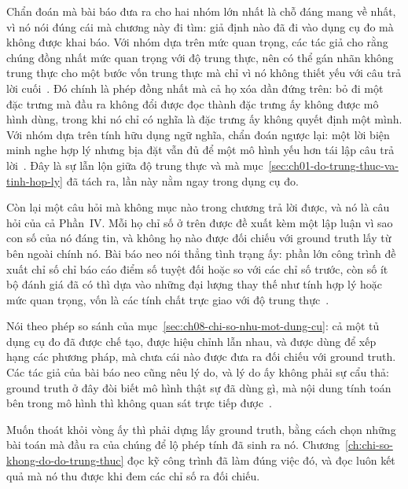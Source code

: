 Chẩn đoán mà bài báo đưa ra cho hai nhóm lớn nhất là chỗ đáng mang về nhất, vì
nó nói đúng cái mà chương này đi tìm: giả định nào đã đi vào dụng cụ đo mà
không được khai báo. Với nhóm dựa trên
mức quan trọng, các tác giả cho rằng chúng đồng nhất mức quan trọng với độ trung
thực, nên có thể gán nhãn không trung thực cho một bước vốn trung thực mà chỉ vì
nó không thiết yếu với câu trả lời cuối~\autocite{p21metrics}. Đó chính là phép
đồng nhất mà cả họ xóa dần đứng trên: bỏ đi một đặc trưng mà đầu ra không đổi
được đọc thành đặc trưng ấy không được mô hình dùng, trong khi nó chỉ có nghĩa
là đặc trưng ấy không quyết định một mình. Với nhóm dựa trên tính hữu dụng ngữ
nghĩa, chẩn đoán ngược lại: một lời biện minh nghe hợp lý nhưng bịa đặt vẫn đủ
để một mô hình yếu hơn tái lập câu trả lời~\autocite{p21metrics}. Đây là sự lẫn
lộn giữa độ trung thực và  mà
mục~\ref{sec:ch01-do-trung-thuc-va-tinh-hop-ly} đã tách ra, lần này nằm ngay
trong dụng cụ đo.

Còn lại một câu hỏi mà không mục nào trong chương trả lời được, và nó là câu hỏi
của cả Phần~IV. Mỗi họ chỉ số ở trên được đề xuất kèm một lập luận vì sao con số
của nó đáng tin, và không họ nào được đối chiếu với ground truth lấy từ bên
ngoài chính nó. Bài báo neo nói thẳng tình trạng ấy: phần lớn công trình đề xuất
chỉ số chỉ báo cáo điểm số tuyệt đối hoặc so với các chỉ số trước, còn số ít bộ
đánh giá đã có thì dựa vào những đại lượng thay thế như tính hợp lý hoặc mức
quan trọng, vốn là các tính chất trực giao với độ trung thực~\autocite{p21metrics}.

Nói theo phép so sánh của mục~\ref{sec:ch08-chi-so-nhu-mot-dung-cu}: cả một tủ
dụng cụ đo đã được chế tạo, được hiệu chỉnh lẫn nhau, và được dùng để xếp hạng
các phương pháp, mà chưa cái nào được đưa ra đối chiếu với ground truth. Các
tác giả của bài báo neo cũng nêu lý do, và lý do ấy không phải sự cẩu thả:
ground truth ở đây đòi biết mô hình thật sự đã dùng gì, mà nội dung tính toán
bên trong mô hình thì không quan sát trực tiếp được~\autocite{p21metrics}.

Muốn thoát khỏi vòng ấy thì phải dựng lấy ground truth, bằng cách chọn những
bài toán mà đầu ra của chúng để lộ phép tính đã sinh ra nó.
Chương~\ref{ch:chi-so-khong-do-do-trung-thuc} đọc kỹ công trình đã làm đúng việc
đó, và đọc luôn kết quả mà nó thu được khi đem các chỉ số ra đối chiếu.
